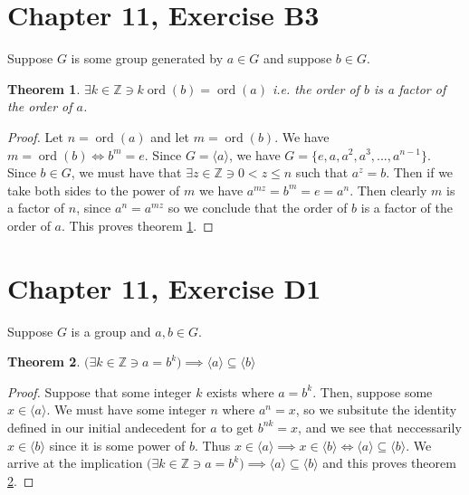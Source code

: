 \documentclass[12pt]{article}
\newcommand{\ints}{\mathbb{Z}}
\newcommand{\ord}{\operatorname{ord}}
\newtheorem{thm}{Theorem}
\begin{document}
\section{Chapter 11, Exercise B3}

Suppose $G$ is some group generated by $a \in G$
and suppose $b \in G$.

\begin{thm} \label{thm2}
	$\exists k \in \ints \ni k\ord(b) = \ord(a)$
	i.e. the order of $b$ is a factor of the order of $a$.
\end{thm}

\begin{proof}
	Let $n = \ord(a)$ and let $m = \ord(b)$.
	We have $m = \ord(b) \iff b^m = e$.
	Since $G = \langle a \rangle$,
	we have $G = \{e, a, a^2, a^3, ..., a^{n-1} \}$.
	Since $b \in G$, we must have that
	$\exists z \in \ints \ni 0 < z \le n$
	such that $a^z = b$.
	Then if we take both sides to the power of $m$
	we have $a^{mz} = b^m = e = a^n$.
	Then clearly $m$ is a factor of $n$,
	since $a^n = a^{mz}$
	so we conclude that
	the order of $b$ is a factor of the order of $a$.
	This proves theorem \ref{thm2}.
\end{proof}

\section{Chapter 11, Exercise D1}

Suppose $G$ is a group and $a,b \in G$.

\begin{thm} \label{thm3}
	$\Big(\exists k \in \ints \ni a = b^k \Big) \implies
	\langle a \rangle \subseteq \langle b \rangle$
\end{thm}

\begin{proof}
	Suppose that some integer $k$ exists
	where $a = b^k$.
	Then, suppose some $x \in \langle a \rangle$.
	We must have some integer $n$ where $a^n = x$,
	so we subsitute the identity defined in our
	initial andecedent for $a$ to get $b^{nk} = x$,
	and we see that neccessarily $x \in \langle b \rangle$
	since it is some power of $b$.
	Thus $x \in \langle a \rangle \implies x \in \langle b \rangle
	\iff \langle a \rangle \subseteq \langle b \rangle$.
	We arrive at the implication
	$\Big(\exists k \in \ints \ni a = b^k \Big) \implies
	\langle a \rangle \subseteq \langle b \rangle$
	and this proves theorem \ref{thm3}.
\end{proof}
\end{document}
